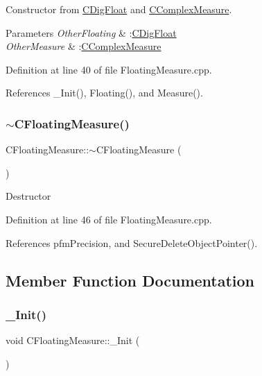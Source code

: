 Constructor from \hyperlink{classCDigFloat}{C\+Dig\+Float} and \hyperlink{classCComplexMeasure}{C\+Complex\+Measure}. 


\begin{DoxyParams}{Parameters}
{\em Other\+Floating} & \+:\hyperlink{classCDigFloat}{C\+Dig\+Float} \\
\hline
{\em Other\+Measure} & \+:\hyperlink{classCComplexMeasure}{C\+Complex\+Measure} \\
\hline
\end{DoxyParams}


Definition at line 40 of file Floating\+Measure.\+cpp.



References \+\_\+\+Init(), Floating(), and Measure().

\mbox{\label{classCFloatingMeasure_a43c9d00b7a9e66da291926f58459c7c8}} 
\subsubsection{\texorpdfstring{$\sim$\+C\+Floating\+Measure()}{~CFloatingMeasure()}}
{\footnotesize\ttfamily C\+Floating\+Measure\+::$\sim$\+C\+Floating\+Measure (\begin{DoxyParamCaption}{ }\end{DoxyParamCaption})}

Destructor 

Definition at line 46 of file Floating\+Measure.\+cpp.



References pfm\+Precision, and Secure\+Delete\+Object\+Pointer().



\subsection{Member Function Documentation}
\mbox{\label{classCFloatingMeasure_a1e8a7467d6435c4cf349198804617623}} 
\subsubsection{\texorpdfstring{\+\_\+\+Init()}{\_Init()}}
{\footnotesize\ttfamily void C\+Floating\+Measure\+::\+\_\+\+Init (\begin{DoxyParamCaption}{ }\end{DoxyParamCaption})\hspace{0.3cm}{\ttfamily [protected]}}



